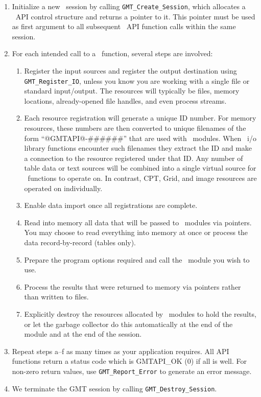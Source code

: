 \documentclass[11pt]{report}
\begin{document}
\begin{enumerate}
\item Initialize a new \GMT\ session by calling \texttt{GMT\_Create\_Session}, which
allocates a \GMT\ API control structure and returns a pointer to it.  This pointer must be used
as first argument to all subsequent \GMT\ API function calls within the same session.
\item For each intended call to a \GMT\ function, several steps are involved:
\begin{enumerate}
\item Register the input sources and register the output destination
using \texttt{GMT\_Register\_IO}, unless you know you are working with a single file
or standard input/output.
The resources will typically be files, memory locations, already-opened file handles,
and even process streams.
\item Each resource registration will generate a unique ID number.  For memory resources, these numbers are
then converted to unique filenames of the form ``@GMTAPI@-\#\#\#\#\#\#'' that are used with \GMT\ modules.  When
\GMT\ i/o library functions encounter such filenames they extract the ID and make a connection
to the resource registered under that ID.  Any number of table data or text sources
will be combined into a single virtual source for \GMT\ functions to operate on.
In contrast, CPT, Grid, and image resources are operated on individually.
\item Enable data import once all registrations are complete.
\item Read into memory all data that will be passed to \GMT\ modules via pointers.  You may choose
	to read everything into memory at once or process the data record-by-record (tables only).
\item Prepare the program options required and call the \GMT\ module you wish to use.
\item Process the results that were returned to memory via pointers rather than written to files.
\item Explicitly destroy the resources allocated by \GMT\ modules to hold the results, or let the
garbage collector do this automatically at the end of the module and at the end of the session.
\end{enumerate}
\item Repeat steps a--f as many times as your application requires.  All API functions
return a status code which is GMTAPI\_OK (0) if all is well.  For non-zero return values, use
\texttt{GMT\_Report\_Error} to generate an error message.
\item We terminate the GMT session by calling \texttt{GMT\_Destroy\_Session}.
\end{enumerate}
\end{document}
